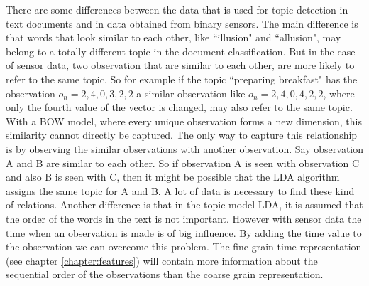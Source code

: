 There are some differences between the data that is used for topic detection in text documents and in data obtained from binary sensors.
The main difference is that words that look similar to each other, like ``illusion" and ``allusion", may belong to a totally different topic in the document classification. But in the case of sensor data, two observation that are similar to each other, are more likely to refer to the same topic. So for example if the topic ``preparing breakfast" has the observation $o_n = {2,4,0,3,2,2}$ a similar observation like $o_n={2,4,0,4,2,2}$, where only the fourth value of the vector is changed, may also refer to the same topic. With a BOW model, where every unique observation forms a new dimension, this similarity cannot directly be captured. The only way to capture this relationship is by observing the similar observations with another observation. Say observation A and B are similar to each other. So if observation A is seen with observation C and also B is seen with C, then it might be possible that the LDA algorithm assigns the same topic for A and B. A lot of data is necessary to find these kind of relations.
Another difference is that in the topic model LDA, it is assumed that the order of the words in the text is not important. However with sensor data the time when an observation is made is of big influence. By adding the time value to the observation we can overcome this problem. The fine grain time representation (see chapter \ref{chapter:features}) will contain more information about the sequential order of the observations than the coarse grain representation.\\


